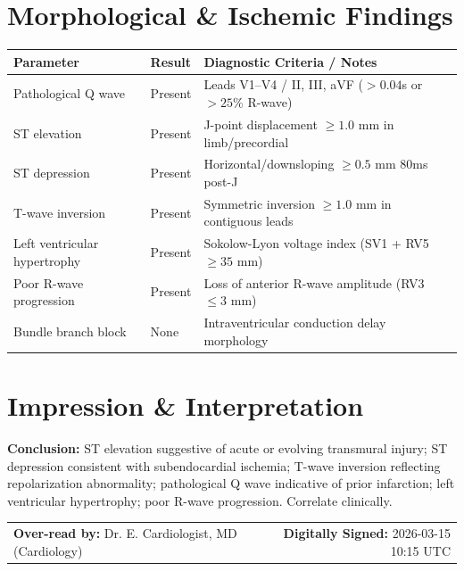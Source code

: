 \documentclass[10pt,a4paper]{article}
\begin{document}
\section*{Morphological \& Ischemic Findings}

\begin{tabular}{@{} p{6.8cm} p{2.8cm} p{5.5cm} @{}}
  \toprule
  \textbf{Parameter} & \textbf{Result} & \textbf{Diagnostic Criteria / Notes} \\
  \midrule
  Pathological Q wave & Present & Leads V1--V4 / II, III, aVF ($>0.04$s or $>25$\% R-wave) \\
  ST elevation & Present & J-point displacement $\ge 1.0$ mm in limb/precordial \\
  ST depression & Present & Horizontal/downsloping $\ge 0.5$ mm 80ms post-J \\
  T-wave inversion & Present & Symmetric inversion $\ge 1.0$ mm in contiguous leads \\
  Left ventricular hypertrophy & Present & Sokolow-Lyon voltage index (SV1 + RV5 $\ge 35$ mm) \\
  Poor R-wave progression & Present & Loss of anterior R-wave amplitude (RV3 $\le 3$ mm) \\
  Bundle branch block & None & Intraventricular conduction delay morphology \\
  \bottomrule
\end{tabular}

\vspace{12pt}

\section*{Impression \& Interpretation}

\noindent
\textbf{Conclusion:} ST elevation suggestive of acute or evolving transmural injury; ST depression consistent with subendocardial ischemia; T-wave inversion reflecting repolarization abnormality; pathological Q wave indicative of prior infarction; left ventricular hypertrophy; poor R-wave progression. Correlate clinically.

\vspace{18pt}

\noindent
\begin{tabular*}{\textwidth}{@{} l @{\extracolsep{\fill}} r @{}}
  \textbf{Over-read by:} Dr. E. Cardiologist, MD (Cardiology) & \textbf{Digitally Signed:} 2026-03-15 10:15 UTC \\
\end{tabular*}
\end{document}
